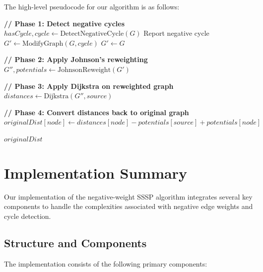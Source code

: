\documentclass[11pt]{article}
\begin{document}
The high-level pseudocode for our algorithm is as follows:

\begin{algorithm}
\caption{Modified SSSP Algorithm for Negative Weights}
\begin{algorithmic}[1]
    \State \textbf{// Phase 1: Detect negative cycles}
    \State $hasCycle, cycle \gets \text{DetectNegativeCycle}(G)$
        \State Report negative cycle
        \State $G' \gets \text{ModifyGraph}(G, cycle)$ 
    \Else
        \State $G' \gets G$
    \EndIf
    
    \State \textbf{// Phase 2: Apply Johnson's reweighting}
    \State $G'', potentials \gets \text{JohnsonReweight}(G')$
    
    \State \textbf{// Phase 3: Apply Dijkstra on reweighted graph}
    \State $distances \gets \text{Dijkstra}(G'', source)$
    
    \State \textbf{// Phase 4: Convert distances back to original graph}
        \State $originalDist[node] \gets distances[node] - potentials[source] + potentials[node]$
    \EndFor
    
    \State \Return $originalDist$
\EndProcedure
\end{algorithmic}
\end{algorithm}

\section{Implementation Summary}

Our implementation of the negative-weight SSSP algorithm integrates several key components to handle the complexities associated with negative edge weights and cycle detection.

\subsection{Structure and Components}

The implementation consists of the following primary components:
\end{document}
